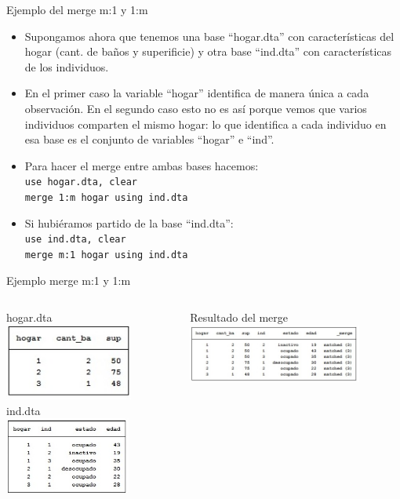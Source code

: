 \documentclass{beamer}
\begin{document}
\begin{frame}{Ejemplo del merge m:1 y 1:m}
\begin{itemize}
\item Supongamos ahora que tenemos una base ``hogar.dta'' con características del hogar (cant. de baños y superificie) y otra base ``ind.dta'' con características de los individuos. 
\item En el primer caso la variable ``hogar'' identifica de manera única a cada observación. En el segundo caso esto no es así porque vemos que varios individuos comparten el mismo hogar: lo que identifica a cada individuo en esa base es el conjunto de variables ``hogar'' e ``ind''.
\item Para hacer el merge entre ambas bases hacemos: \\
\texttt{use hogar.dta, clear}\\
\texttt{merge 1:m hogar using ind.dta}
\item Si hubiéramos partido de la base ``ind.dta'': \\
\texttt{use ind.dta, clear}\\
\texttt{merge m:1 hogar using ind.dta}
\end{itemize}
\end{frame}

\begin{frame}{Ejemplo merge m:1 y 1:m}
\begin{columns}
\begin{column}{5cm}
hogar.dta\\
\includegraphics[height=2.5cm]{hogar.jpg}\\\bigskip
ind.dta\\
\includegraphics[height=2.5cm]{ind.jpg}
\end{column}
\begin{column}{5cm}
Resultado del merge\\
\includegraphics[height=1.9cm]{merge2.jpg}
\end{column}
\end{columns}
\end{frame}
\end{document}
